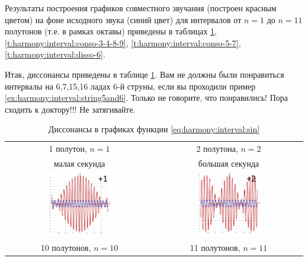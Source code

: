 Результаты построения графиков совместного звучания (построен красным цветом) на фоне исходного звука (синий цвет) для интервалов от $n=1$ до $n=11$ полутонов (т.е. в рамках октавы) приведены в таблицах \ref{t:harmony:interval:disso-1-2-10-11}, \ref{t:harmony:interval:conso-3-4-8-9}, \ref{t:harmony:interval:conso-5-7}, \ref{t:harmony:interval:disso-6}.


Итак, диссонансы приведены в таблице \ref{t:harmony:interval:disso-1-2-10-11}. Вам не должны были понравиться интервалы на 6,7,15,16 ладах 6-й струны, если вы проходили пример \ref{ex:harmony:interval:string5and6}. Только не говорите, что понравились! Пора сходить к доктору!!! Не затягивайте.

\begin{table}[!ht]
    \caption{Диссонансы в графиках функции \ref{eq:harmony:interval:sin}}
    \label{t:harmony:interval:disso-1-2-10-11}
    \centering
    \begin{tabular}{c|c}
        \hline\hline
        1 полутон, $n=1$        & 2 полутона, $n=2$ \\
        малая секунда           & большая секунда \\
        \includegraphics[width=0.45\textwidth]{fig/intervals/i01}
            & \includegraphics[width=0.45\textwidth]{fig/intervals/i02} \\
        \hline\hline
        10 полутонов, $n=10$    & 11 полутонов, $n=11$ \\

\end{tabular}
\end{table}
